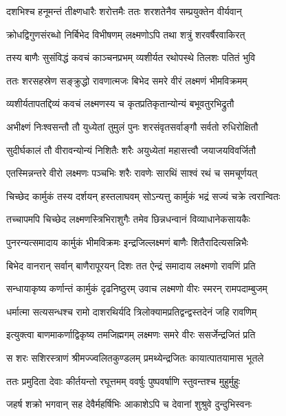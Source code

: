 \twolineshloka
{दशभिश्च हनूमन्तं तीक्ष्णधारैः शरोत्तमैः}
{ततः शरशतेनैव सम्प्रयुक्तेन वीर्यवान्} %

\twolineshloka
{क्रोधद्विगुणसंरब्धो निर्बिभेद विभीषणम्}
{लक्ष्मणोऽपि तथा शत्रुं शरवर्षैरवाकिरत्} %

\twolineshloka
{तस्य बाणैः सुसंविद्धं कवचं काञ्चनप्रभम्}
{व्यशीर्यत रथोपस्थे तिलशः पतितं भुवि} %

\twolineshloka
{ततः शरसहस्रेण सङ्क्रुद्धो रावणात्मजः}
{बिभेद समरे वीरं लक्ष्मणं भीमविक्रमम्} %

\twolineshloka
{व्यशीर्यतापतद्दिव्यं कवचं लक्ष्मणस्य च}
{कृतप्रतिकृतान्योन्यं बभूवतुरभिद्रुतौ} %

\twolineshloka
{अभीक्ष्णं निःश्वसन्तौ तौ युध्येतां तुमुलं पुनः}
{शरसंवृतसर्वाङ्गौ सर्वतो रुधिरोक्षितौ} %

\twolineshloka
{सुदीर्घकालं तौ वीरावन्योन्यं निशितैः शरैः}
{अयुध्येतां महासत्त्वौ जयाजयविवर्जितौ} %

\twolineshloka
{एतस्मिन्नन्तरे वीरो लक्ष्मणः पञ्चभिः शरैः}
{रावणेः सारथिं साश्वं रथं च समचूर्णयत्} %

\twolineshloka
{चिच्छेद कार्मुकं तस्य दर्शयन् हस्तलाघवम्}
{सोऽन्यत्तु कार्मुकं भद्रं सज्यं चक्रे त्वरान्वितः} %

\twolineshloka
{तच्चापमपि चिच्छेद लक्ष्मणस्त्रिभिराशुगैः}
{तमेव छिन्नधन्वानं विव्याधानेकसायकैः} %

\twolineshloka
{पुनरन्यत्समादाय कार्मुकं भीमविक्रमः}
{इन्द्रजिल्लक्ष्मणं बाणैः शितैरादित्यसन्निभैः} %

\twolineshloka
{बिभेद वानरान् सर्वान् बाणैरापूरयन् दिशः}
{तत ऐन्द्रं समादाय लक्ष्मणो रावणिं प्रति} %

\twolineshloka
{सन्धायाकृष्य कर्णान्तं कार्मुकं दृढनिष्ठुरम्}
{उवाच लक्ष्मणो वीरः स्मरन् रामपदाम्बुजम्} %

\twolineshloka
{धर्मात्मा सत्यसन्धश्च रामो दाशरथिर्यदि}
{त्रिलोक्यामप्रतिद्वन्द्वस्तदेनं जहि रावणिम्} %

\twolineshloka
{इत्युक्त्वा बाणमाकर्णाद्विकृष्य तमजिह्मगम्}
{लक्ष्मणः समरे वीरः ससर्जेन्द्रजितं प्रति} %

\twolineshloka
{स शरः सशिरस्त्राणं श्रीमज्ज्वलितकुण्डलम्}
{प्रमथ्येन्द्रजितः कायात्पातयामास भूतले} %

\twolineshloka
{ततः प्रमुदिता देवाः कीर्तयन्तो रघूत्तमम्}
{ववर्षुः पुष्पवर्षाणि स्तुवन्तश्च मुहुर्मुहुः} %

\twolineshloka
{जहर्ष शक्रो भगवान् सह देवैर्महर्षिभिः}
{आकाशेऽपि च देवानां शुश्रुवे दुन्दुभिस्वनः} %

